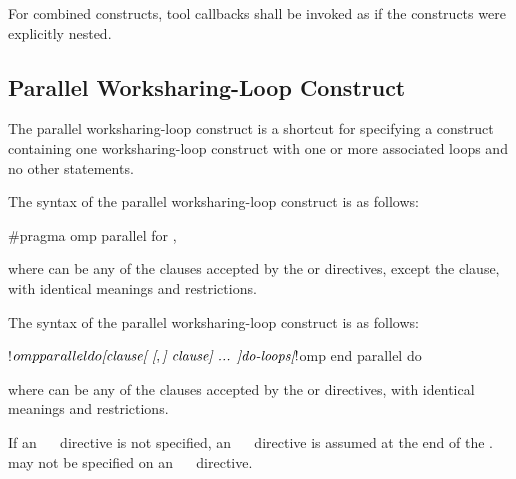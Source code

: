 For combined constructs, tool callbacks shall be invoked as if the constructs were
explicitly nested.






\subsection{Parallel Worksharing-Loop Construct}
\label{subsec:Parallel Worksharing-Loop Construct}
\summary
The parallel worksharing-loop construct is a shortcut for specifying a  construct
containing one worksharing-loop construct with one or more associated loops and no other statements.



\syntax
\begin{ccppspecific}
The syntax of the parallel worksharing-loop construct is as follows:

\begin{ompcPragma}
#pragma omp parallel for \plc{[clause[ [},\plc{] clause] ... ] new-line}
\end{ompcPragma}

where  can be any of the clauses accepted by the  or  directives,
except the  clause, with identical meanings and restrictions.
\end{ccppspecific}

\begin{fortranspecific}
The syntax of the parallel worksharing-loop construct is as follows:

\begin{ompfPragma}
!$omp parallel do \plc{[clause[ [},\plc{] clause] ... ]}
   \plc{do-loops}
\plc{[}!$omp end parallel do\plc{]}
\end{ompfPragma}

where  can be any of the clauses accepted by the  or  directives,
with identical meanings and restrictions.

If an ~~ directive is not specified, an ~~ directive is
assumed at the end of the .  may not be specified on an
~~ directive.
\end{fortranspecific}

